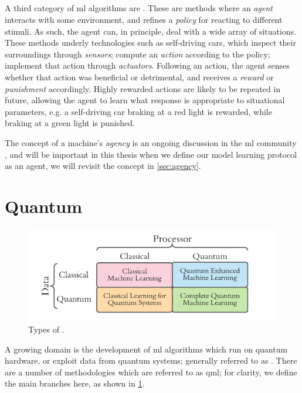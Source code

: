 \subsection{}
A third category of \gls{ml} algorithms are . 
These are methods where an \emph{agent} interacts with some environment, 
    and refines a \emph{policy} for reacting to different stimuli. 
As such, the agent can, in principle, deal with a wide array of situations. 
These methods underly technologies such as self-driving cars, 
    which inspect their surroundings through \emph{sensors};
    compute an \emph{action} according to the policy; 
    implement that action through \emph{actuators}.
Following an action, the agent senses whether that action was beneficial or detrimental, 
    and receives a \emph{reward} or \emph{punishment} accordingly. 
Highly rewarded actions are likely to be repeated in future, allowing the agent to learn what response is 
    appropriate to situational parameters, 
    e.g. a self-driving car braking at a red light is rewarded, 
    while braking at a green light is punished. 
\par 
The concept of a machine's \emph{agency} is an ongoing discussion in the \gls{ml} community \cite{franklin1996agent, wooldridge2009introduction}, 
    and will be important in this thesis when we define our model learning protocol as an agent, 
    we will revisit the concept in \cref{sec:agency}.

\section{Quantum }
\begin{figure}
    \begin{center}
        \includegraphics{contextual_review/figures/qml_types.pdf}
    \end{center}
    \caption[Types of ]{Types of .}
    \label{fig:qml_types}
\end{figure}
A growing domain is the development of \gls{ml} algorithms which run on quantum hardware, 
    or exploit data from quantum systems; generally referred to as  \cite{biamonte2017quantum, adcock2015advances}. 
There are a number of methodologies which are referred to as \gls{qml};
    for clarity, we define the main branches here, as shown in \cref{fig:qml_types}. 

